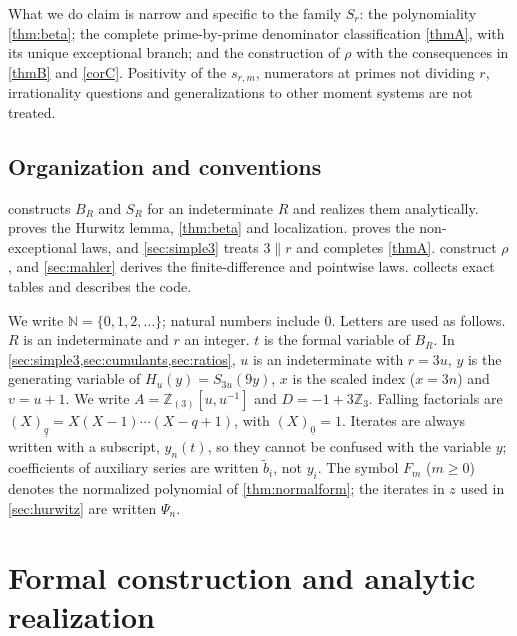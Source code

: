 \documentclass[11pt,reqno]{amsart}
\theoremstyle{definition}
\theoremstyle{remark}
\theoremstyle{plain}
\newcommand{\Z}{\mathbb Z}
\newcommand{\N}{\mathbb N}
\newcommand{\Zloc}{\mathbb Z_{(3)}}
\newcommand{\fall}[2]{(#1)_{\underline{#2}}}
\begin{document}
What we do claim is narrow and specific to the family $S_r$: the polynomiality \cref{thm:beta}; the complete prime-by-prime denominator classification \cref{thmA}, with its unique exceptional branch; and the construction of $\rho$ with the consequences in \cref{thmB} and \cref{corC}. Positivity of the $s_{r,m}$, numerators at primes not dividing $r$, irrationality questions and generalizations to other moment systems are not treated.

\subsection{Organization and conventions}
 constructs $B_R$ and $S_R$ for an indeterminate $R$ and realizes them analytically.  proves the Hurwitz lemma, \cref{thm:beta} and localization.  proves the non-exceptional laws, and \cref{sec:simple3} treats $3\parallel r$ and completes \cref{thmA}.  construct $\rho$, and \cref{sec:mahler} derives the finite-difference and pointwise laws.  collects exact tables and describes the code.

We write $\N=\{0,1,2,\dots\}$; natural numbers include $0$. Letters are used as follows. $R$ is an indeterminate and $r$ an integer. $t$ is the formal variable of $B_R$. In \cref{sec:simple3,sec:cumulants,sec:ratios}, $u$ is an indeterminate with $r=3u$, $y$ is the generating variable of $H_u(y)=S_{3u}(9y)$, $x$ is the scaled index ($x=3n$) and $v=u+1$. We write $A=\Zloc[u,u^{-1}]$ and $D=-1+3\Z_3$. Falling factorials are $\fall Xq=X(X-1)\cdots(X-q+1)$, with $\fall X0=1$. Iterates are always written with a subscript, $y_n(t)$, so they cannot be confused with the variable $y$; coefficients of auxiliary series are written $\tilde b_i$, not $y_i$. The symbol $F_m$ ($m\ge0$) denotes the normalized polynomial of \cref{thm:normalform}; the iterates in $z$ used in \cref{sec:hurwitz} are written $\Psi_n$.

\section{Formal construction and analytic realization}\label{sec:formal}
\end{document}
